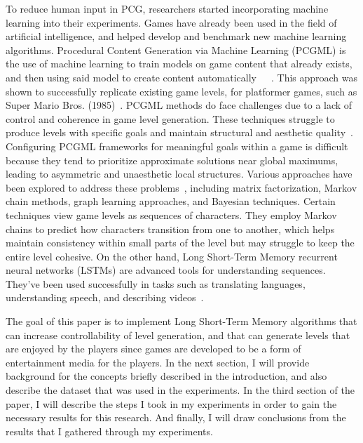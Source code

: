 \documentclass[runningheads]{llncs}
\begin{document}
To reduce human input in PCG, researchers started incorporating machine learning into their experiments. Games have already been used in the field of artificial intelligence, and helped develop and benchmark new machine learning algorithms. Procedural Content Generation via Machine Learning (PCGML) is the use of machine learning to train models on game content that already exists, and then using said model to create content automatically~\cite{ref_article10}~\cite{ref_article11}~\cite{ref_article12}. This approach was shown to successfully replicate existing game levels, for platformer games, such as Super Mario Bros. (1985)~\cite{ref_article13}. PCGML methods do face challenges due to a lack of control and coherence in game level generation. These techniques struggle to produce levels with specific goals and maintain structural and aesthetic quality~\cite{ref_article2}. Configuring PCGML frameworks for meaningful goals within a game is difficult because they tend to prioritize approximate solutions near global maximums, leading to asymmetric and unaesthetic local structures. Various approaches have been explored to address these problems~\cite{ref_article14}, including matrix factorization, Markov chain methods, graph learning approaches, and Bayesian techniques. Certain techniques view game levels as sequences of characters. They employ Markov chains to predict how characters transition from one to another, which helps maintain consistency within small parts of the level but may struggle to keep the entire level cohesive. On the other hand, Long Short-Term Memory recurrent neural networks (LSTMs) are advanced tools for understanding sequences. They've been used successfully in tasks such as translating languages, understanding speech, and describing videos~\cite{ref_article14}.

The goal of this paper is to implement Long Short-Term Memory algorithms that can increase controllability of level generation, and that can generate levels that are enjoyed by the players since games are developed to be a form of entertainment media for the players. In the next section, I will provide background for the concepts briefly described in the introduction, and also describe the dataset that was used in the experiments. In the third section of the paper, I will describe the steps I took in my experiments in order to gain the necessary results for this research. And finally, I will draw conclusions from the results that I gathered through my experiments.
\end{document}
